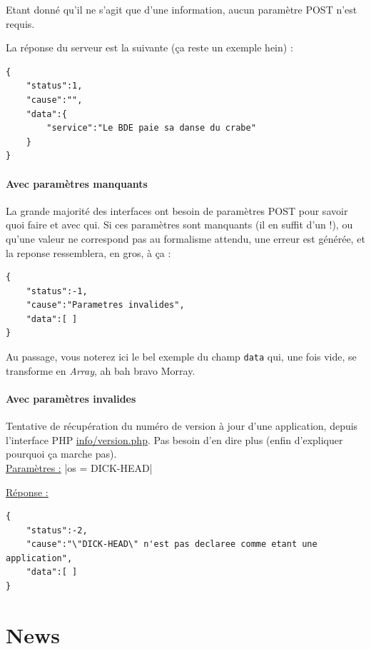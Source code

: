 \documentclass[12pt,a4paper,oneside]{report}
\begin{document}
\noindent Etant donné qu'il ne s'agit que d'une information, aucun paramètre POST n'est requis.

\noindent La réponse du serveur est la suivante (ça reste un exemple hein) :

\begin{verbatim}
{
    "status":1,
    "cause":"",
    "data":{
        "service":"Le BDE paie sa danse du crabe"
    }
}
\end{verbatim}

\subsubsection{Avec paramètres manquants}

La grande majorité des interfaces ont besoin de paramètres POST pour savoir quoi faire et avec qui. Si ces paramètres sont manquants (il en suffit d'un !), ou qu'une valeur ne correspond pas au formalisme attendu, une erreur est générée, et la reponse ressemblera, en gros, à ça :

\begin{verbatim}
{
    "status":-1,
    "cause":"Parametres invalides",
    "data":[ ]
}
\end{verbatim}

\noindent Au passage, vous noterez ici le bel exemple du champ \texttt{data} qui, une fois vide, se transforme en \textit{Array}, ah bah bravo Morray.

\subsubsection{Avec paramètres invalides}

Tentative de récupération du numéro de version à jour d'une application, depuis l'interface PHP \url{info/version.php}. Pas besoin d'en dire plus (enfin d'expliquer pourquoi ça marche pas).\\

\noindent \underline{Paramètres :} |os = DICK-HEAD|

\noindent \underline{Réponse :}

\begin{verbatim}
{
    "status":-2,
    "cause":"\"DICK-HEAD\" n'est pas declaree comme etant une application",
    "data":[ ]
}
\end{verbatim}

\chapter{News}
\end{document}
